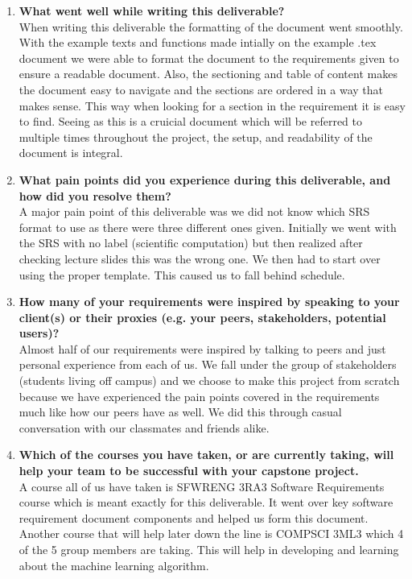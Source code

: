 \documentclass{scrreprt}
\theoremstyle{definition}
\begin{document}
\begin{enumerate}
  \item \textbf{What went well while writing this deliverable?} \\
When writing this deliverable the formatting of the document went smoothly. With the example texts and functions made intially on the example .tex document we were able to format the document to the requirements given to ensure a readable document. Also, the sectioning and table of content makes the document easy to navigate and the sections are ordered in a way that makes sense. This way when looking for a section in the requirement it is easy to find. Seeing as this is a cruicial document which will be referred to multiple times throughout the project, the setup, and readability of the document is integral.
  \item \textbf{What pain points did you experience during this deliverable, and how did
  you resolve them?}\\
A major pain point of this deliverable was we did not know which SRS format to use as there were three different ones given. Initially we went with the SRS with no label (scientific computation) but then realized after checking lecture slides this was the wrong one. We then had to start over using the proper template. This caused us to fall behind schedule.
  \item \textbf{How many of your requirements were inspired by speaking to your
  client(s) or their proxies (e.g. your peers, stakeholders, potential users)?}\\
Almost half of our requirements were inspired by talking to peers and just personal experience from each of us. We fall under the group of stakeholders (students living off campus) and we choose to make this project from scratch because we have experienced the pain points covered in the requirements much like how our peers have as well. We did this through casual conversation with our classmates and friends alike.
  \item \textbf{Which of the courses you have taken, or are currently taking, will help
  your team to be successful with your capstone project.}\\
A course all of us have taken is SFWRENG 3RA3 Software Requirements course which is meant exactly for this deliverable. It went over key software requirement document components and helped us form this document. Another course that will help later down the line is COMPSCI 3ML3 which 4 of the 5 group members are taking. This will help in developing and learning about the machine learning algorithm.

\end{enumerate}
\end{document}
